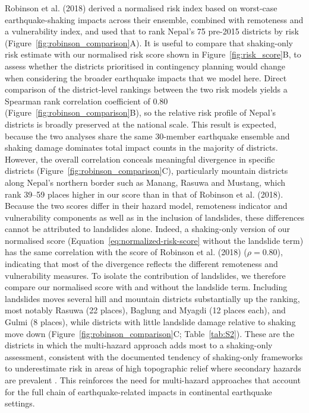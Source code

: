 \documentclass[preprint,12pt,authoryear]{elsarticle}
\begin{document}
Robinson et al. (2018) derived a normalised risk index based on worst-case earthquake-shaking impacts across their ensemble, combined with remoteness and a vulnerability index, and used that to rank Nepal's 75 pre-2015 districts by risk (Figure~\ref{fig:robinson_comparison}A). It is useful to compare that shaking-only risk estimate with our normalised risk score shown in Figure~\ref{fig:risk_score}B, to assess whether the districts prioritised in contingency planning would change when considering the broader earthquake impacts that we model here. Direct comparison of the district-level rankings between the two risk models yields a Spearman rank correlation coefficient of 0.80 (Figure~\ref{fig:robinson_comparison}B), so the relative risk profile of Nepal's districts is broadly preserved at the national scale. This result is expected, because the two analyses share the same 30-member earthquake ensemble and shaking damage dominates total impact counts in the majority of districts. However, the overall correlation conceals meaningful divergence in specific districts (Figure~\ref{fig:robinson_comparison}C), particularly mountain districts along Nepal's northern border such as Manang, Rasuwa and Mustang, which rank 39--59 places higher in our score than in that of Robinson et al. (2018). Because the two scores differ in their hazard model, remoteness indicator and vulnerability components as well as in the inclusion of landslides, these differences cannot be attributed to landslides alone. Indeed, a shaking-only version of our normalised score (Equation~\ref{eq:normalized-risk-score} without the landslide term) has the same correlation with the score of Robinson et al. (2018) ($\rho = 0.80$), indicating that most of the divergence reflects the different remoteness and vulnerability measures. To isolate the contribution of landslides, we therefore compare our normalised score with and without the landslide term. Including landslides moves several hill and mountain districts substantially up the ranking, most notably Rasuwa (22 places), Baglung and Myagdi (12 places each), and Gulmi (8 places), while districts with little landslide damage relative to shaking move down (Figure~\ref{fig:robinson_comparison}C; Table~\ref{tab:S2}). These are the districts in which the multi-hazard approach adds most to a shaking-only assessment, consistent with the documented tendency of shaking-only frameworks to underestimate risk in areas of high topographic relief where secondary hazards are prevalent \citep{Budimir2014}. This reinforces the need for multi-hazard approaches that account for the full chain of earthquake-related impacts in continental earthquake settings.
\end{document}
